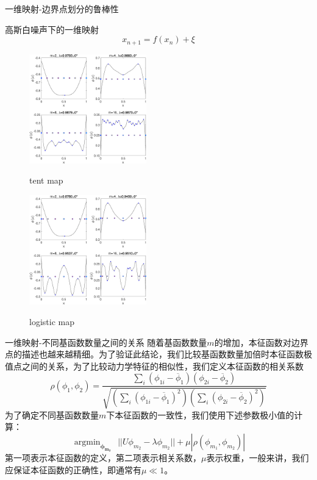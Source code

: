 \documentclass{beamer}
\begin{document}
    \begin{frame}{一维映射-边界点划分的鲁棒性}
    	\begin{block}{高斯白噪声下的一维映射}
    		$$x_{n+1}=f(x_n)+\xi$$
    	\end{block}
    \begin{figure}
    	\begin{minipage}{0.45\linewidth}
    		\centerline{\includegraphics[width=2in]{images/05a-Tent_eigen_Gauss_n1000_m2-4-8-16_d0-001.eps}}
    		\centerline{tent map}
    	\end{minipage}
    	\hfill
    	\begin{minipage}{0.45\linewidth}
    		\centerline{\includegraphics[width=2in]{images/05b-Logistic_eigen_Gauss_n1000_m2-4-8-16_d0-001.eps}}
    		\centerline{logistic map}
    	\end{minipage}
    \end{figure}
    \end{frame}
	\begin{frame}{一维映射-不同基函数数量之间的关系}
		随着基函数数量$m$的增加，本征函数对边界点的描述也越来越精细。为了验证此结论，我们比较基函数数量加倍时本征函数极值点之间的关系，为了比较动力学特征的相似性，我们定义本征函数的相关系数
		$$\rho(\phi_1,\phi_2)=\dfrac{\sum_i(\phi_{1i}-\overline{\phi}_1)(\phi_{2i}-\overline{\phi}_2)}{\sqrt{(\sum_i(\phi_{1i}-\overline{\phi}_1)^2)(\sum_i(\phi_{2i}-\overline{\phi}_2)^2)}}$$
		为了确定不同基函数数量$m$下本征函数的一致性，我们使用下述参数极小值的计算：
		$$\mathop{\arg\min}_{\boldsymbol{\phi_{m_2}}} \ \ || U\phi_{m_2}-\lambda \phi_{m_2} || + \mu |\rho(\phi_{m_1},\phi_{m_2})|$$
		第一项表示本征函数的定义，第二项表示相关系数，$\mu$表示权重，一般来讲，我们应保证本征函数的正确性，即通常有$\mu\ll 1$。
    \end{frame}
\end{document}
